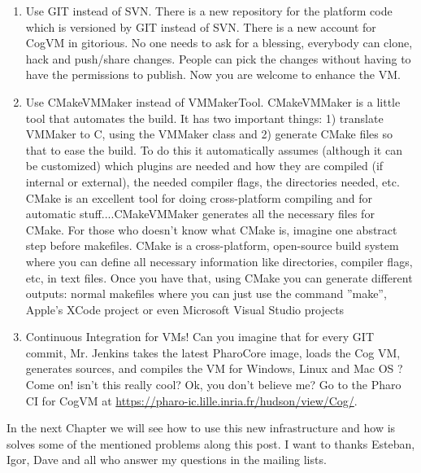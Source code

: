 \documentclass[a4paper,10pt,twoside]{book}
\begin{document}
\begin{enumerate}
\item Use GIT instead of SVN. There is a new repository for the platform code which is versioned by GIT instead of SVN. There is a new account for CogVM in gitorious. No one needs to ask for a blessing, everybody can clone, hack and push/share changes. People can pick the changes without having to have the permissions to publish. Now you are welcome to enhance the VM. 

\item Use CMakeVMMaker instead of VMMakerTool. CMakeVMMaker is a little tool that automates the build. It has two important things: 1) translate VMMaker to C, using the VMMaker class and 2) generate CMake files so that to ease the build. To do this  it automatically assumes (although it can be customized) which plugins are needed and how they are compiled (if internal or external), the needed compiler flags, the directories needed, etc. CMake is an excellent tool for doing cross-platform compiling and for automatic stuff....CMakeVMMaker generates all the necessary files for CMake. For those who doesn't know what CMake is, imagine one abstract step before makefiles. CMake is a cross-platform, open-source build system where you can define all necessary information like directories, compiler flags, etc, in text files. Once you have that, using CMake you can generate different outputs: normal makefiles where you can just use the command ''make'', Apple's XCode project or even Microsoft Visual Studio projects 

\item Continuous Integration for VMs!  Can you imagine that for every GIT commit, Mr. Jenkins takes the latest PharoCore image, loads the Cog VM, generates sources, and compiles the VM for Windows, Linux and Mac OS ? Come on! isn't this really cool?  Ok, you don't believe me? Go to the Pharo CI for CogVM at \url{https://pharo-ic.lille.inria.fr/hudson/view/Cog/}.

\end{enumerate}


In the next Chapter we will see how to use this new infrastructure and how is solves some of the mentioned problems along this post. I want to thanks Esteban, Igor, Dave and all who answer my questions in the mailing lists.
\end{document}
